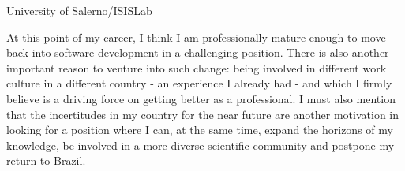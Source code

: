 \documentclass[11pt]{letter}
\begin{document}
\begin{letter}{University of Salerno/ISISLab}
  

  

  
  At this point of my career, I think I am professionally mature enough to move back into software development in a challenging position. There is also another important reason to venture into such change: being involved in different work culture in a different country - an experience I already had - and which I firmly believe is a driving force on getting better as a professional. I must also mention that the incertitudes in my country for the near future are another motivation in looking for a position where I can, at the same time, expand the horizons of my knowledge, be involved in a more diverse scientific community and postpone my return to Brazil.%



\end{letter}
\end{document}
